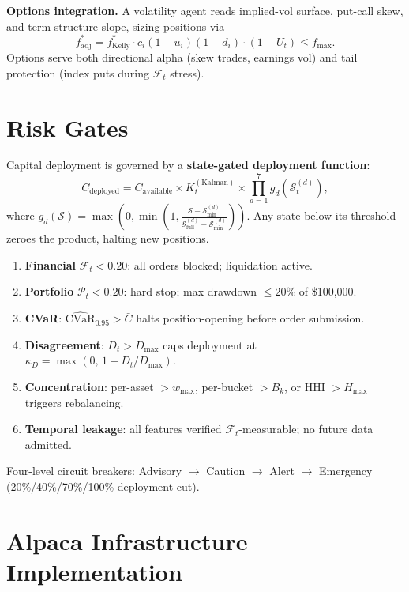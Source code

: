 \documentclass[7pt,letterpaper]{article}
\begin{document}
\textbf{Options integration.} A volatility agent reads implied-vol surface, put-call skew, and term-structure slope, sizing positions via
\begin{equation}
  f^*_{\text{adj}} = f^*_{\text{Kelly}} \cdot c_i(1-u_i)(1-d_i)\cdot(1-U_t) \leq f_{\max}.
\end{equation}
Options serve both directional alpha (skew trades, earnings vol) and tail protection (index puts during $\mathcal{F}_t$ stress).

\section{Risk Gates}

Capital deployment is governed by a \textbf{state-gated deployment function}:
\begin{equation}
  C_{\text{deployed}} = C_{\text{available}} \times K_t^{(\text{Kalman})} \times \prod_{d=1}^{7} g_d\!\left(\mathcal{S}_t^{(d)}\right),
\end{equation}
where $g_d(\mathcal{S}) = \max\!\left(0,\min\!\left(1,\tfrac{\mathcal{S}-\mathcal{S}_{\min}^{(d)}}{\mathcal{S}_{\text{full}}^{(d)}-\mathcal{S}_{\min}^{(d)}}\right)\right)$. Any state below its threshold zeroes the product, halting new positions.

\begin{enumerate}[leftmargin=1.2em,itemsep=0pt,topsep=1pt]
  \item \textbf{Financial} $\mathcal{F}_t < 0.20$: all orders blocked; liquidation active.
  \item \textbf{Portfolio} $\mathcal{P}_t < 0.20$: hard stop; max drawdown $\leq\!20\%$ of \$100{,}000.
  \item \textbf{CVaR}: $\widehat{\text{CVaR}}_{0.95} > \bar{C}$ halts position-opening before order submission.
  \item \textbf{Disagreement}: $D_t > D_{\max}$ caps deployment at $\kappa_D = \max(0,\,1\!-\!D_t/D_{\max})$.
  \item \textbf{Concentration}: per-asset $> w_{\max}$, per-bucket $> B_k$, or HHI $> H_{\max}$ triggers rebalancing.
  \item \textbf{Temporal leakage}: all features verified $\mathcal{F}_t$-measurable; no future data admitted.
\end{enumerate}

Four-level circuit breakers: Advisory $\to$ Caution $\to$ Alert $\to$ Emergency (20\%/40\%/70\%/100\% deployment cut).

\section{Alpaca Infrastructure Implementation}
\end{document}
